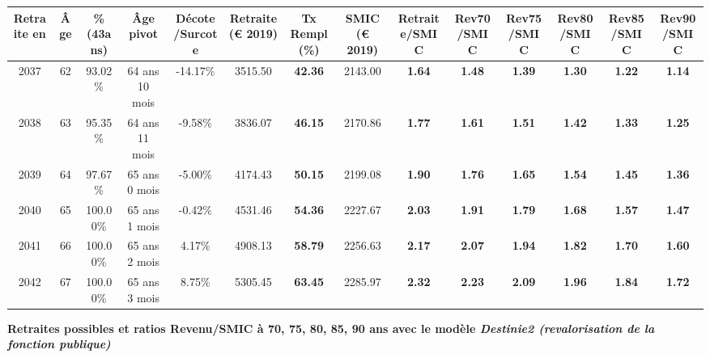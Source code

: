 \begin{adjustbox}{max width=\textwidth} 
\begin{tabular}[htb]{|c|c||c|c|c||c|c||c||c|c|c|c|c|c|} 
\hline 
 Retraite en &  Âge &  \%(43ans) &  Âge pivot &  Décote/Surcote &  Retraite (\euro{} 2019) &  Tx Rempl(\%) &  SMIC (\euro{} 2019) &  Retraite/SMIC &  Rev70/SMIC &  Rev75/SMIC &  Rev80/SMIC &  Rev85/SMIC &  Rev90/SMIC \\ 
\hline \hline 
 2037 &  62 &  93.02\% &  64 ans 10 mois &  -14.17\% &  3515.50 &  {\bf 42.36} &  2143.00 &  {\bf 1.64} &  {\bf 1.48} &  {\bf 1.39} &  {\bf 1.30} &  {\bf 1.22} &  {\bf 1.14} \\ 
\hline 
 2038 &  63 &  95.35\% &  64 ans 11 mois &  -9.58\% &  3836.07 &  {\bf 46.15} &  2170.86 &  {\bf 1.77} &  {\bf 1.61} &  {\bf 1.51} &  {\bf 1.42} &  {\bf 1.33} &  {\bf 1.25} \\ 
\hline 
 2039 &  64 &  97.67\% &  65 ans 0 mois &  -5.00\% &  4174.43 &  {\bf 50.15} &  2199.08 &  {\bf 1.90} &  {\bf 1.76} &  {\bf 1.65} &  {\bf 1.54} &  {\bf 1.45} &  {\bf 1.36} \\ 
\hline 
 2040 &  65 &  100.00\% &  65 ans 1 mois &  -0.42\% &  4531.46 &  {\bf 54.36} &  2227.67 &  {\bf 2.03} &  {\bf 1.91} &  {\bf 1.79} &  {\bf 1.68} &  {\bf 1.57} &  {\bf 1.47} \\ 
\hline 
 2041 &  66 &  100.00\% &  65 ans 2 mois &  4.17\% &  4908.13 &  {\bf 58.79} &  2256.63 &  {\bf 2.17} &  {\bf 2.07} &  {\bf 1.94} &  {\bf 1.82} &  {\bf 1.70} &  {\bf 1.60} \\ 
\hline 
 2042 &  67 &  100.00\% &  65 ans 3 mois &  8.75\% &  5305.45 &  {\bf 63.45} &  2285.97 &  {\bf 2.32} &  {\bf 2.23} &  {\bf 2.09} &  {\bf 1.96} &  {\bf 1.84} &  {\bf 1.72} \\ 
\hline 
\hline 
\end{tabular} 
\end{adjustbox} 
 
 \vspace{0.1cm} 
{\bf \noindent Retraites possibles et ratios Revenu/SMIC à 70, 75, 80, 85, 90 ans avec le modèle \emph{Destinie2 (revalorisation de la fonction publique)}}  
 
